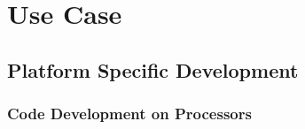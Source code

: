 \section{Use Case}

\subsection{Platform Specific Development}


\subsubsection{Code Development on Processors}

